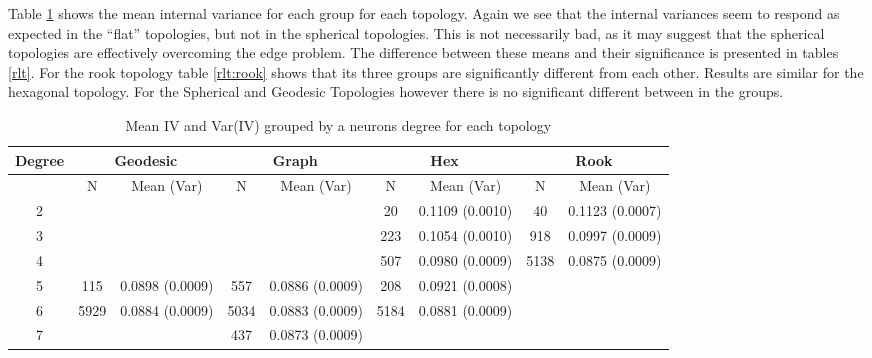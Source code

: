 Table \ref{meanvar1} shows the mean internal variance for each group for each
topology. Again we see that the internal variances seem to respond as expected
in the ``flat'' topologies, but not in the spherical topologies.  This is not
necessarily bad, as it may suggest that the spherical topologies are
effectively overcoming the edge problem.  The difference between these means
and their significance is presented in tables \ref{rlt}.  For the rook
topology table \ref{rlt:rook} shows that its three groups are significantly
different from each other. Results are similar for the hexagonal topology. For
the Spherical and Geodesic Topologies however there is no significant
different between in the groups.

\begin{table}[hbt]
\centering
\caption{Mean IV and Var(IV) grouped by a neurons degree for each topology}
\label{meanvar1}
\begin{tabular}{|c||c|c||c|c||c|c||c|c|}
\hline
\textbf{Degree} & \multicolumn{2}{c||}{\textbf{Geodesic}} &
\multicolumn{2}{c||}{\textbf{Graph}} & \multicolumn{2}{c||}{\textbf{Hex}} &
\multicolumn{2}{c|}{\textbf{Rook}} \\
\hline
& N & Mean (Var) & N & Mean (Var) & N & Mean (Var) & N & Mean (Var) \\

\hline
2&&&&& 20& 0.1109 (0.0010)& 40& 0.1123 (0.0007)\\ 
3&&&&& 223& 0.1054 (0.0010)& 918& 0.0997 (0.0009)\\ 
4&&&&& 507& 0.0980 (0.0009)& 5138& 0.0875 (0.0009)\\ 
5& 115& 0.0898 (0.0009)& 557& 0.0886 (0.0009)& 208& 0.0921 (0.0008)&&\\ 
6& 5929& 0.0884 (0.0009)& 5034& 0.0883 (0.0009)& 5184& 0.0881 (0.0009)&&\\ 
7&&& 437& 0.0873 (0.0009)&&&&\\ 
\hline
\end{tabular} \end{table}

